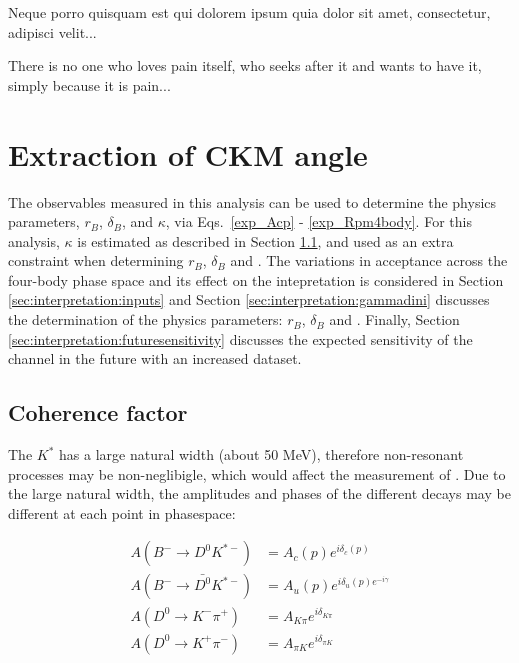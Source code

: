 \clearpage
\begin{savequote}[8cm]
\textlatin{Neque porro quisquam est qui dolorem ipsum quia dolor sit amet, consectetur, adipisci velit...}

There is no one who loves pain itself, who seeks after it and wants to have it, simply because it is pain...
\end{savequote}

\chapter{\label{ch:6-interpretation}Extraction of CKM angle \Pgamma} 

\minitoc

The \CP observables measured in this analysis can be used to determine the physics parameters, $r_B$, $\delta_B$, \Pgamma and $\kappa$, via Eqs.~\ref{exp_Acp} - \ref{exp_Rpm4body}. For this analysis, $\kappa$ is estimated as described in Section \ref{sec:interpretation:coherence}, and used as an extra constraint when determining $r_B$, $\delta_B$ and \Pgamma. The variations in acceptance across the four-body phase space and its effect on the intepretation is considered in Section \ref{sec:interpretation:inputs} and Section \ref{sec:interpretation:gammadini} discusses the determination of the physics parameters: $r_B$, $\delta_B$ and \Pgamma. Finally, Section \ref{sec:interpretation:futuresensitivity} discusses the expected sensitivity of the \btodkst channel in the future with an increased dataset.

\section{Coherence factor}
\label{sec:interpretation:coherence}

The $K^*$ has a large natural width (about 50 MeV), therefore non-resonant processes may be non-neglibigle, which would affect the measurement of \Pgamma. Due to the large natural width, the amplitudes and phases of the different decays may be different at each point in phasespace:

\begin{align*}
A(B^- \to D^0 K^{*-}) &= A_c(p) e^{i\delta_c(p)} \\
A(B^- \to \bar{D^0} K^{*-}) &= A_u(p) e^{i\delta_u(p) e^{-i\gamma}} \\
A(D^0 \to K^-\pi^+) &= A_{K\pi} e^{i\delta_{K\pi}} \\
A(D^0 \to K^+\pi^-) &= A_{{\pi}K} e^{i\delta_{{\pi}K}} 
\end{align*}

